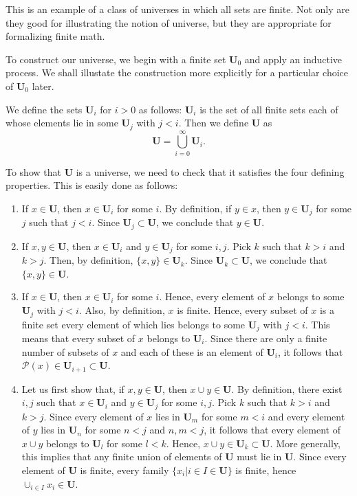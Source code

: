\documentclass[12pt]{article}
\begin{document}
This is an example of a class of universes in which all sets are finite.  Not only are they good for illustrating the notion of universe, but they are appropriate for formalizing finite math.

To construct our universe, we begin with a finite set $\mathbf{U}_0$ and apply an inductive process.  We shall illustate the construction more explicitly for a particular choice of $\mathbf{U}_0$ later.

We define the sets $\mathbf{U}_i$ for $i > 0$ as follows:  $\mathbf{U}_i$ is the set of all finite sets each of whose elements lie in some $\mathbf{U}_j$ with $j < i$.  Then we define $\mathbf{U}$ as
 $$\mathbf{U} = \bigcup_{i=0}^\infty \mathbf{U}_i.$$

To show that $\mathbf{U}$ is a universe, we need to check that it satisfies the four defining properties.  This is easily done as follows:
\begin{enumerate}
\item  If $x \in \mathbf{U}$, then $x \in \mathbf{U}_i$ for some $i$.  By definition, if $y \in x$, then $y \in \mathbf{U}_j$ for some $j$ such that $j < i$.  Since $\mathbf{U}_j \subset \mathbf{U}$, we conclude that $y \in \mathbf{U}$.
\item  If $x,y  \in \mathbf{U}$, then $x \in \mathbf{U}_i$ and $y \in \mathbf{U}_j$ for some $i,j$.  Pick $k$ such that $k > i$ and $k > j$.  Then, by definition, $\{x,y\} \in \mathbf{U}_k$.  Since $\mathbf{U}_k \subset \mathbf{U}$, we conclude that $\{x,y\} \in \mathbf{U}$.
\item  If $x \in \mathbf{U}$, then $x \in \mathbf{U}_i$ for some $i$.  Hence, every element of $x$ belongs to some $\mathbf{U}_j$ with $j < i$.  Also, by definition, $x$ is finite.  Hence, every subset of $x$ is a finite set every element of which lies belongs to some $\mathbf{U}_j$ with $j < i$.  This means that every subset of $x$ belongs to $\mathbf{U}_i$.  Since there are only a finite number of subsets of $x$ and each of these is an element of $\mathbf{U}_i$, it follows that $\mathcal{P}(x) \in \mathbf{U}_{i+1} \subset \mathbf{U}$.
\item  Let us first show that, if $x,y  \in \mathbf{U}$, then $x \cup y  \in \mathbf{U}$.  By definition, there exist $i, j$ such that $x \in \mathbf{U}_i$ and $y \in \mathbf{U}_j$ for some $i,j$.  Pick $k$ such that $k > i$ and $k > j$.  Since every element of $x$ lies in $\mathbf{U}_m$ for some $m < i$ and every element of $y$ lies in $\mathbf{U}_n$ for some $n < j$ and $n, m < j$, it follows that every element of $x \cup y$ belongs to $\mathbf{U}_l$ for some $l < k$.  Hence, $x \cup y \in \mathbf{U}_k \subset \mathbf{U}$.  More generally, this implies that any finite union of elements of $\mathbf{U}$ must lie in $\mathbf{U}$.  Since every element of $\mathbf{U}$ is finite, every family $\{x_i | i\in I\in\mathbf{U}\}$ is finite, hence $\cup_{i\in I} x_i\in\mathbf{U}$.
\end{enumerate}
\end{document}
